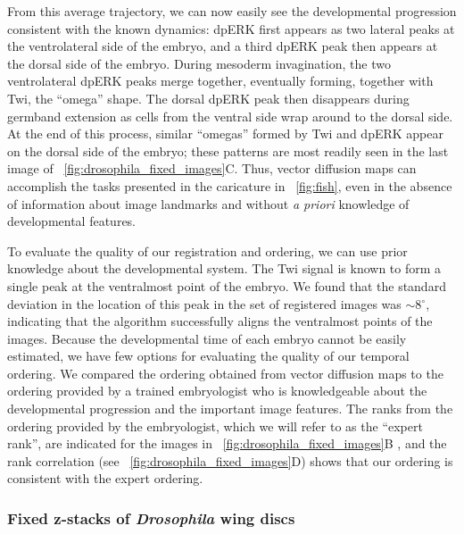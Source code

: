 From this average trajectory, we can now easily see the developmental progression consistent with the known dynamics:
%
dpERK first appears as two lateral peaks at the ventrolateral side of the embryo, and a third dpERK peak then appears at the dorsal side of the embryo.
%
During mesoderm invagination, the two ventrolateral dpERK peaks merge together, eventually forming, together with Twi, the ``omega'' shape.
%
The dorsal dpERK peak then disappears during germband extension as cells from the ventral side wrap around to the dorsal side.
%
At the end of this process, similar ``omegas'' formed by Twi and dpERK appear on the dorsal side of the embryo; these patterns are most readily seen in the last image of \fig~\ref{fig:drosophila_fixed_images}C.
%
Thus, vector diffusion maps can accomplish the tasks presented in the caricature in \fig~\ref{fig:fish}, even in the absence of information about image landmarks and without {\it a priori} knowledge of developmental features.

To evaluate the quality of our registration and ordering, we can use prior knowledge about the developmental system.
%
The Twi signal is known to form a single peak at the ventralmost point of the embryo.
%
We found that the standard deviation in the location of this peak in the set of registered images was $\sim$8$^\circ$,
indicating that the algorithm successfully aligns the ventralmost points of the images.
%
Because the developmental time of each embryo cannot be easily estimated, we have few options for evaluating the quality of our temporal ordering.
%
We compared the ordering obtained from vector diffusion maps to the ordering provided by a trained embryologist who is knowledgeable about the developmental progression and the important image features.
%
The ranks from the ordering provided by the embryologist, which we will refer to as the ``expert rank'', are indicated for the images in \fig~\ref{fig:drosophila_fixed_images}B , and the rank correlation (see \fig~\ref{fig:drosophila_fixed_images}D) shows that our ordering is consistent with the expert ordering.


\subsubsection{Fixed z-stacks of {\em Drosophila} wing discs}

